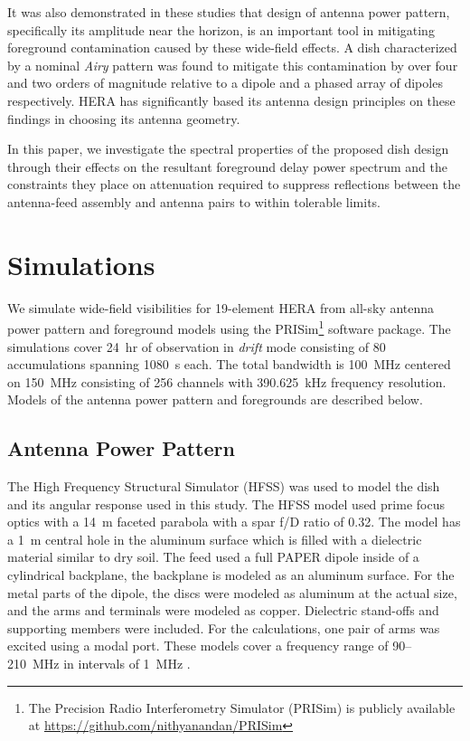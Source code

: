\documentclass[preprint2,iop,numberedappendix,twocolappendix,appendixfloats]{emulateapj}
\begin{document}
It was also demonstrated in these studies that design of antenna power pattern, specifically its amplitude near the horizon, is an important tool in mitigating foreground contamination caused by these wide-field effects. A dish characterized by a nominal {\it Airy} pattern was found to mitigate this contamination by over four and two orders of magnitude relative to a dipole and a phased array of dipoles respectively. HERA has significantly based its antenna design principles on these findings in choosing its antenna geometry.

In this paper, we investigate the spectral properties of the proposed dish design through their effects on the resultant foreground delay power spectrum and the constraints they place on attenuation required to suppress reflections between the antenna-feed assembly and antenna pairs to within tolerable limits. 

\section{Simulations}\label{sec:sim}

We simulate wide-field visibilities for 19-element HERA from all-sky antenna power pattern and foreground models using the PRISim\footnote{The Precision Radio Interferometry Simulator (PRISim) is publicly available at \url{https://github.com/nithyanandan/PRISim}} software package. The simulations cover 24~hr of observation in {\it drift} mode consisting of 80 accumulations spanning 1080~s each. The total bandwidth is 100~MHz centered on 150~MHz consisting of 256 channels with 390.625~kHz frequency resolution. Models of the antenna power pattern and foregrounds are described below.

\subsection{Antenna Power Pattern}\label{sec:beam-model}

The High Frequency Structural Simulator (HFSS) was used to model the dish and its angular response used in this study. The HFSS model used prime focus optics with a 14~m faceted parabola with a spar f/D ratio of 0.32.  The model has a 1~m central hole in the aluminum surface which is filled with a dielectric material similar to dry soil. The feed used a full PAPER dipole inside of a cylindrical backplane, the backplane is modeled as an aluminum surface. For the metal parts of the dipole, the discs were modeled as aluminum at the actual size, and the arms and terminals were modeled as copper. Dielectric stand-offs and supporting members were included. For the calculations, one pair of arms was excited using a modal port. These models cover a frequency range of 90--210~MHz in intervals of 1~MHz \citep{deb16}. 
\end{document}
